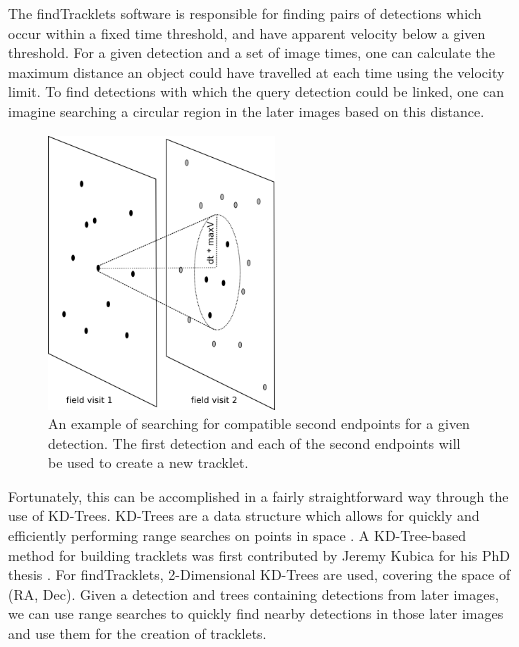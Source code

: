
The findTracklets software is responsible for finding pairs of
detections which occur within a fixed time threshold, and have
apparent velocity below a given threshold.  For a given detection and
a set of image times, one can calculate the maximum distance an object
could have travelled at each time using the velocity limit.  To find
detections with which the query detection could be linked, one can
imagine searching a circular region in the later images based on this
distance.

\begin{figure}[ht]
  \centering
    \includegraphics[width=6cm]{illustrations/findTracklets-onequery.png}
    \caption{ An example of searching for compatible second endpoints
      for a given detection.  The first detection and each of the
      second endpoints will be used to create a new tracklet.}
\label{findTrackletsIllustrated}
\end{figure}


Fortunately, this can be
accomplished in a fairly straightforward way through the use of
KD-Trees.  KD-Trees are a data structure which allows for quickly and
efficiently performing range searches on points in space
\citep{bentley_kdtrees}.  A KD-Tree-based method for building
tracklets was first contributed by Jeremy Kubica for his PhD thesis
\citep{kubica_thesis}.  For findTracklets, 2-Dimensional KD-Trees are
used, covering the space of (RA, Dec).  Given a detection and trees
containing detections from later images, we can use range searches to
quickly find nearby detections in those later images and use them for
the creation of tracklets.

